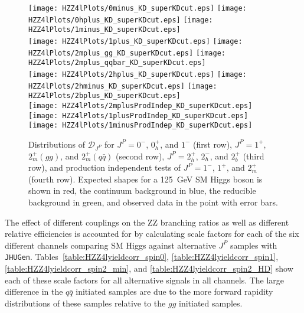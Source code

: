 \begin{figure}
\begin{center}
\texttt{[image: HZZ4lPlots/0minus\_KD\_superKDcut.eps]}
\texttt{[image: HZZ4lPlots/0hplus\_KD\_superKDcut.eps]}
\texttt{[image: HZZ4lPlots/1minus\_KD\_superKDcut.eps]}\\
\texttt{[image: HZZ4lPlots/1plus\_KD\_superKDcut.eps]}
\texttt{[image: HZZ4lPlots/2mplus\_gg\_KD\_superKDcut.eps]}
\texttt{[image: HZZ4lPlots/2mplus\_qqbar\_KD\_superKDcut.eps]}\\
\texttt{[image: HZZ4lPlots/2hplus\_KD\_superKDcut.eps]}
\texttt{[image: HZZ4lPlots/2hminus\_KD\_superKDcut.eps]}
\texttt{[image: HZZ4lPlots/2bplus\_KD\_superKDcut.eps]}\\
\texttt{[image: HZZ4lPlots/2mplusProdIndep\_KD\_superKDcut.eps]}
\texttt{[image: HZZ4lPlots/1plusProdIndep\_KD\_superKDcut.eps]}
\texttt{[image: HZZ4lPlots/1minusProdIndep\_KD\_superKDcut.eps]}
\caption{Distributions of $\mathscr{D}_{J^P}$ for $J^P=0^-$, 
$0_h^+$, and $1^-$ (first row), $J^P=1^+$, $2_m^+(gg)$, and 
$2_m^+(q\bar{q})$ (second row), $J^P=2_h^+$, $2_h^-$, and $2_b^+$ 
(third row), and production independent tests of $J^P=1^-$, $1^+$,
and $2_m^+$ (fourth row).  Expected shapes for a 125~GeV SM Higgs
boson is shown in red, the continuum background in blue, the
reducible background in green, and observed data in the point
with error bars.}
\label{fig:HZZ4ldjp}
\end{center}
\end{figure}

The effect of different couplings on the ZZ branching 
ratios as well as different relative efficiencies is accounted
for by calculating scale factors for each of the six different 
channels comparing SM Higgs against alternative $J^P$ samples 
with \verb+JHUGen+.  Tables~\ref{table:HZZ4lyieldcorr_spin0},
\ref{table:HZZ4lyieldcorr_spin1},
\ref{table:HZZ4lyieldcorr_spin2_min},
and \ref{table:HZZ4lyieldcorr_spin2_HD} show
 each of these scale
factors for all alternative signals in all channels.  The large
difference in the $q\bar{q}$ initiated samples are due to the
more forward rapidity distributions of these samples relative to 
the $gg$ initiated samples.  

